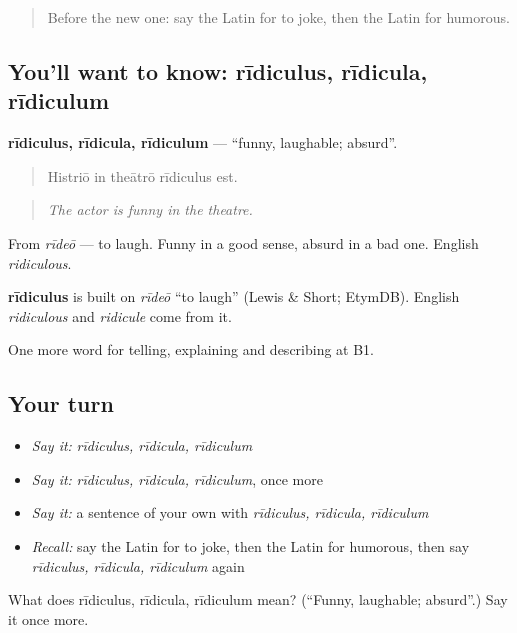 \begin{quote}
Before the new one: say the Latin for to joke, then the Latin for humorous.
\end{quote}

\subsection*{You'll want to know: rīdiculus, rīdicula, rīdiculum}
\textbf{rīdiculus, rīdicula, rīdiculum} — \textquotedblleft{}funny, laughable; absurd\textquotedblright{}.

\begin{quote}
Histriō in theātrō rīdiculus est.
\end{quote}

\begin{quote}
\emph{The actor is funny in the theatre.}
\end{quote}

From \emph{rīdeō} — to laugh. Funny in a good sense, absurd in a bad one. English \emph{ridiculous}.

\begin{cousinweb}
\textbf{rīdiculus} is built on \emph{rīdeō} \textquotedblleft{}to laugh\textquotedblright{} (Lewis \& Short; EtymDB). English \emph{ridiculous} and \emph{ridicule} come from it.
\end{cousinweb}

\begin{grammarlens}[title={What you've built}]
One more word for telling, explaining and describing at B1.
\end{grammarlens}

\subsection*{Your turn}
\begin{itemize}
\raggedright
  \item \emph{Say it:} \emph{rīdiculus, rīdicula, rīdiculum}
  \item \emph{Say it:} \emph{rīdiculus, rīdicula, rīdiculum}, once more
  \item \emph{Say it:} a sentence of your own with \emph{rīdiculus, rīdicula, rīdiculum}
  \item \emph{Recall:} say the Latin for to joke, then the Latin for humorous, then say \emph{rīdiculus, rīdicula, rīdiculum} again
\end{itemize}

\begin{tcolorbox}[breakable,colback=teal!4,colframe=teal!35!black,title={Before you move on}]
What does rīdiculus, rīdicula, rīdiculum mean? (\textquotedblleft{}Funny, laughable; absurd\textquotedblright{}.) Say it once more.
\end{tcolorbox}

